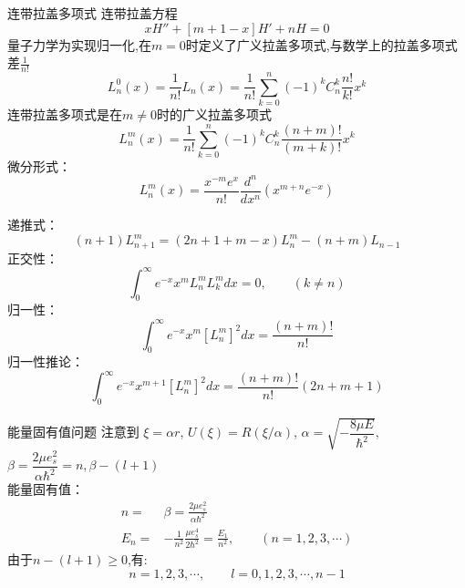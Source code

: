 	{连带拉盖多项式}
	连带拉盖方程
	\begin{equation*}
		\boxed{x H''  + [m+1 -x] H' +n H =0}
	\end{equation*}	
	量子力学为实现归一化,在$m=0$时定义了广义拉盖多项式,与数学上的拉盖多项式差$\frac{1}{n!}$
	\begin{equation*}
		L^0 _n (x)= \frac{1} {n!} L_n (x) = \frac{1} {n!} \sum_{k=0}^{n} (-1)^k C^k _n \frac{n!}{k!}x^k
	\end{equation*}	
	连带拉盖多项式是在$m\ne0$时的广义拉盖多项式
	\begin{equation*}
		L^m _n (x)= \frac{1} {n!}  \sum_{k=0}^{n} (-1)^k C^k _n \frac{(n+m)!}{(m+k)!}x^k
	\end{equation*}	
	微分形式： 
	\begin{equation*}
		L^m _n(x) =\frac{x^{-m}e^x  }{n!} \frac{d ^n}{d x^n} (x^{m+n} e^{-x})
	\end{equation*}	
		


	递推式：
	\begin{equation*}
		(n+1)	L^m _{n+1} = (2n+1+m -x) L^m _n  - (n+m)  L_{n-1}  
	\end{equation*}	
	正交性：
	\begin{equation*}
		\int_{0}^{\infty}  e^{-x} x^m  L^m _n L^ m _k dx =0, \qquad  (k\ne n)
	\end{equation*}	
	归一性：
	\begin{equation*}
		\int_{0}^{\infty}  e^{-x} x^m  [L^m _{n}]^2  dx = \frac{(n+m)!}{n!} 
	\end{equation*}			
	归一性推论：
	\begin{equation*}
		\int_{0}^{\infty}  e^{-x} x^{m+1}  [L^m _{n}]^2  dx = \frac{(n+m)!}{n!}  (2n+m+1)
	\end{equation*}			
		


	{能量固有值问题}	
	注意到 $\xi=\alpha r$, $U(\xi)=R(\xi /\alpha) $, $\alpha =\sqrt{-\dfrac{8\mu E}{\hbar^2}}$, $\beta=\dfrac{2\mu e^2 _s}{\alpha \hbar^2}=n, \beta-(l+1)$\\
	能量固有值：
	\\\begin{equation*}
		\begin{split}
			n =&\beta = \frac{2\mu e^2 _s}{\alpha \hbar ^2} \\
			E_n =& - \frac{1}{n^2} \frac{\mu e^4 _s }{2 \hbar ^2} =\frac{E_1}{n^2}, \qquad (n=1,2,3,\cdots) 
		\end{split}		
	\end{equation*}	
	由于${n-(l+1)\ge 0}$,有:
	\[n=1,2,3,\cdots, \qquad l=0,1,2,3,\cdots, n-1\]	

